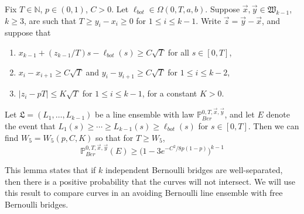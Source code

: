\begin{lemma}\label{CurveSeparation} Fix $T\in\mathbb{N}$, $p\in (0,1)$, $C > 0$. Let $\ell_{bot} \in \Omega(0,T,a,b)$. Suppose $\vec{x},\vec{y}\in\mathfrak{W}_{k-1}$, $k\geq 3$, are such that $T \geq y_i - x_i \geq 0$ for $1\leq i\leq k-1$. Write $\vec{z} = \vec{y} - \vec{x}$, and suppose that
	\begin{enumerate}[label=(\arabic*)]
		
		\item $x_{k-1} + (z_{k-1}/T)s - \ell_{bot}(s) \geq C\sqrt{T}$ for all $s\in[0,T]$,
		
		\item $x_i - x_{i+1} \geq C\sqrt{T}$ and $y_i - y_{i+1} \geq C\sqrt{T}$ for $1\leq i\leq k-2$,
		
		\item $|z_i - pT| \leq K\sqrt{T}$ for $1\leq i\leq k-1$, for a constant $K > 0$.
		
	\end{enumerate}
	Let $\mathfrak{L} = (L_1,\dots,L_{k-1})$ be a line ensemble with law $\mathbb{P}^{0,T,\vec{x},\vec{y}}_{Ber}$, and let $E$ denote the event that $L_1(s) \geq \cdots \geq L_{k-1}(s) \geq \ell_{bot}(s)$ for $s\in[0,T]$. Then we can find $W_5 = W_5(p,C,K)$ so that for $T\geq W_5$,
	\begin{equation}\label{SepBound}
	\mathbb{P}^{0,T,\vec{x},\vec{y}}_{Ber}(E) \geq \big(1 - 3e^{-C^2/8p(1-p)}\big)^{k-1}
	\end{equation}
\end{lemma}

\begin{remark}
	This lemma states that if $k$ independent Bernoulli bridges are well-separated, then there is a positive probability that the curves will not intersect. We will use this result to compare curves in an avoiding Bernoulli line ensemble with free Bernoulli bridges.
\end{remark}

